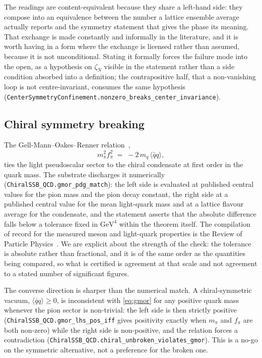 \documentclass[aps,prd,nofootinbib,superscriptaddress,12pt]{revtex4-2}
\DeclareRobustCommand{\lb}{\discretionary{}{}{}}
\begin{document}
The readings are content-equivalent because they share a left-hand side: they
compose into an equivalence between the number a lattice ensemble average
actually reports and the symmetry statement that gives the phase its meaning.
That exchange is made constantly and informally in the literature, and it is
worth having in a form where the exchange is licensed rather than assumed,
because it is not unconditional. Stating it formally forces the failure mode
into the open, as a hypothesis on $\zeta_N$ visible in the statement rather than
a side condition absorbed into a definition; the contrapositive half, that a
non-vanishing loop is not centre-invariant, consumes the same hypothesis
(\texttt{Center\lb{}Symmetry\lb{}Confinement.\lb{}nonzero\_\lb{}breaks\_\lb{}center\_\lb{}invariance}).

\subsection{Chiral symmetry breaking}

The Gell-Mann--Oakes--Renner relation~\cite{GellMannOakesRenner1968},
\begin{equation}
\label{eq:gmor}
m_\pi^2 f_\pi^2 \;=\; -2\, m_q \, \langle \bar q q \rangle ,
\end{equation}
ties the light pseudoscalar sector to the chiral condensate at first order in
the quark mass. The substrate discharges it numerically
(\texttt{Chiral\lb{}SSB\_\lb{}QCD.\lb{}gmor\_\lb{}pdg\_\lb{}match}): the left side is evaluated at
published central values for the pion mass and the pion decay constant, the
right side at a published central value for the mean light-quark mass and at a
lattice flavour average for the condensate, and the statement asserts that the
absolute difference falls below a tolerance fixed in $\mathrm{GeV}^4$ within the
theorem itself. The compilation of record for the measured meson and light-quark
properties is the Review of Particle Physics~\cite{PDG2024}. We are explicit
about the strength of the check: the tolerance is absolute rather than
fractional, and it is of the same order as the quantities being compared, so
what is certified is agreement at that scale and not agreement to a stated
number of significant figures.

The converse direction is sharper than the numerical match. A chiral-symmetric
vacuum, $\langle \bar q q \rangle \ge 0$, is inconsistent with
\eqref{eq:gmor} for any positive quark mass whenever the pion sector is
non-trivial: the left side is then strictly positive
(\texttt{Chiral\lb{}SSB\_\lb{}QCD.\lb{}gmor\_\lb{}lhs\_\lb{}pos\_\lb{}iff} gives positivity exactly when
$m_\pi$ and $f_\pi$ are both non-zero) while the right side is non-positive, and
the relation forces a contradiction
(\texttt{Chiral\lb{}SSB\_\lb{}QCD.\lb{}chiral\_\lb{}unbroken\_\lb{}violates\_\lb{}gmor}). This is a no-go on
the symmetric alternative, not a preference for the broken one.
\end{document}
